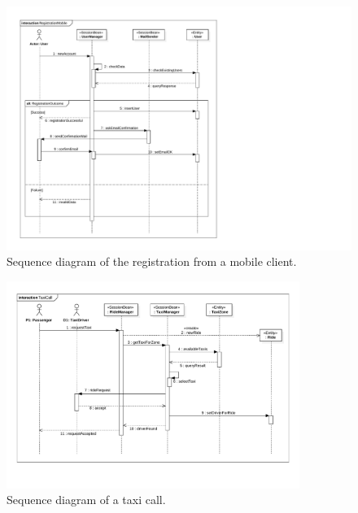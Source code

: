 \begin{figure}[h]
    \centering
    \includegraphics[width=\textwidth]{diagrams/sequence_registrationmobile}
    \caption{Sequence diagram of the registration from a mobile client.}
    \label{fig:sequence-registrationmobile}
\end{figure}

\begin{figure}[h]
    \centering
    \includegraphics[width=0.85\textwidth]{diagrams/sequence_taxicall}
    \caption{Sequence diagram of a taxi call.}
    \label{fig:sequence-taxicall}
\end{figure}

